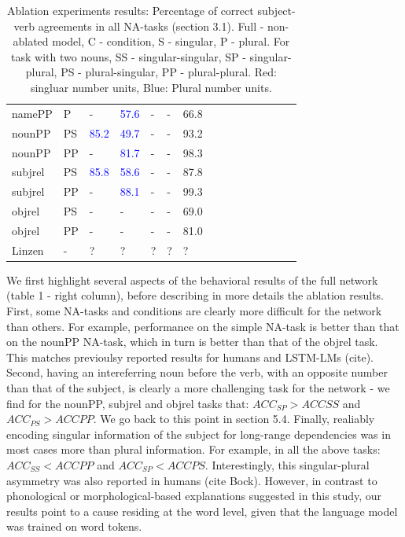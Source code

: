 \begin{center}
\begin{table}[ht]
\begin{tabular}{|P{1.4cm}|P{0.4cm}||P{0.6cm}|P{0.6cm}|P{0.6cm}|P{0.6cm}|P{0.6cm}|P{0.6cm}|P{0.6cm}|P{0.6cm}|P{0.6cm}|P{0.6cm}|P{0.6cm}|P{0.6cm}||P{0.6cm}|}
\B namePP & \B P & - &  \textcolor{blue}{57.6} &  - &  - &  66.8 \\

\B nounPP & \B PS &  \textcolor{blue}{85.2} &  \textcolor{blue}{49.7} & - &  - &  93.2 \\

\B nounPP & \B PP &  - &  \textcolor{blue}{81.7} &  - &  - &  98.3 \\

\B subjrel & \B PS &  \textcolor{blue}{85.8}  &  \textcolor{blue}{58.6}  &  - &  - &  87.8 \\

\B subjrel & \B PP &  - &  \textcolor{blue}{88.1} &  - &  - &  99.3 \\

\B objrel & \B PS & - &  - &  - &  - &  69.0 \\

\B objrel & \B PP &  - &  - &  - &  - &  81.0 \\
\hline
\hline
\B Linzen & \B - &  ? &  ? &  ? &  ? &  ? \\
\hline
\end{tabular}
\caption{Ablation experiments results: Percentage of correct subject-verb agreements in all NA-tasks (section 3.1). Full - non-ablated model, C - condition, S - singular, P - plural. For task with two nouns, SS - singular-singular, SP - singular-plural, PS - plural-singular, PP - plural-plural. Red: singluar number units, Blue: Plural number units.}
\end{table}
\end{center}

We first highlight several aspects of the behavioral results of the full network (table 1 - right column), before describing in more details the ablation results. First, some NA-tasks and conditions are clearly more difficult for the network than others. For example, performance on the simple NA-task is better than that on the nounPP NA-task, which in turn is better than that of the objrel task. This matches previoulsy reported results for humans and LSTM-LMs (cite). Second, having an intereferring noun before the verb, with an opposite number than that of the subject, is clearly a more challenging task for the network - we find for the nounPP, subjrel and objrel tasks that: $ACC_{SP}>ACC{SS}$ and $ACC_{PS}>ACC{PP}$. We go back to this point in section 5.4. Finally, realiably encoding singular information of the subject for long-range dependencies was in most cases more than plural information. For example, in all the above tasks: $ACC_{SS}<ACC{PP}$ and $ACC_{SP}<ACC{PS}$. Interestingly, this singular-plural asymmetry was also reported in humans (cite Bock). However, in contrast to phonological or morphological-based explanations suggested in this study, our results point to a cause residing at the word level, given that the language model was trained on word tokens.

